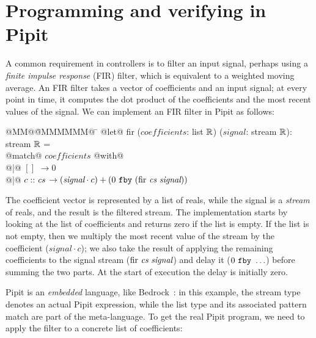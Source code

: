 \documentclass[sigplan,screen, review]{acmart}
\begin{document}
\section{Programming and verifying in Pipit}
\label{s:tut}

A common requirement in controllers is to filter an input signal, perhaps using a \emph{finite impulse response} (FIR) filter, which is equivalent to a weighted moving average.
An FIR filter takes a vector of coefficients and an input signal; at every point in time, it computes the dot product of the coefficients and the most recent values of the signal.
We can implement an FIR filter in Pipit as follows:

\newcommand\signal{\textit{signal}}
\begin{tabbing}
  @MM@\= @MMMMMM@ \= \kill
  @let@ fir ($\textit{coefficients}$: list $\mathbb{R}$) ($\signal$: stream $\mathbb{R}$): stream $\mathbb{R}$ = \\
    \> @match@ $\textit{coefficients}$ @with@ \\
    \> @|@ $[]$ \> $\to 0$ \\
    \> @|@ $c :: \textit{cs} $ \> $\to (\signal \cdot c) + (\xfby{0}{(\mbox{fir~} \cs~\signal)})$
\end{tabbing}

The coefficient vector is represented by a list of reals, while the signal is a \emph{stream} of reals, and the result is the filtered stream.
The implementation starts by looking at the list of coefficients and returns zero if the list is empty.
If the list is not empty, then we multiply the most recent value of the stream by the coefficient ($\signal \cdot c$); we also take the result of applying the remaining coefficients to the signal stream ($\mbox{fir~} \cs ~ \signal$) and delay it ($0~\texttt{fby}~\ldots$) before summing the two parts.
At the start of execution the delay is initially zero.

Pipit is an \emph{embedded} language, like Bedrock~\cite{chlipala2013bedrock}: in this example, the stream type denotes an actual Pipit expression, while the list type and its associated pattern match are part of the \fstar{} meta-language.
To get the real Pipit program, we need to apply the filter to a concrete list of coefficients:
\end{document}
